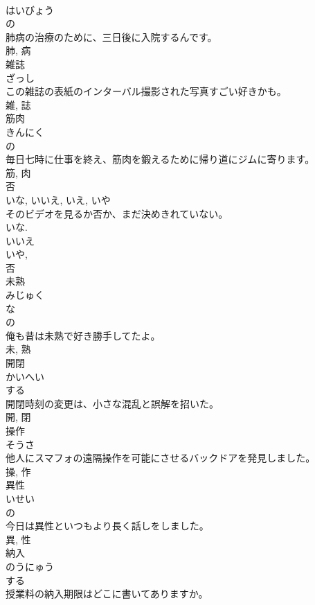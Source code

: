 \documentclass[8pt]{extreport}
\begin{document}
\begin{CJK}{UTF8}{min}
\\	はいびょう	
\\	の 
\\	肺病の治療のために、三日後に入院するんです。	
\\	肺, 病	
\\	雑誌	
\\	ざっし	
\\	この雑誌の表紙のインターバル撮影された写真すごい好きかも。	
\\	雑, 誌	
\\	筋肉	
\\	きんにく	
\\	の 
\\	毎日七時に仕事を終え、筋肉を鍛えるために帰り道にジムに寄ります。	
\\	筋, 肉	
\\	否	
\\	いな, いいえ, いえ, いや	
\\	そのビデオを見るか否か、まだ決めきれていない。	
\\	いな. 
\\	いいえ 
\\	いや, 
\\	否	
\\	未熟	
\\	みじゅく	
\\	な 
\\	の 
\\	俺も昔は未熟で好き勝手してたよ。	
\\	未, 熟	
\\	開閉	
\\	かいへい	
\\	する 
\\	開閉時刻の変更は、小さな混乱と誤解を招いた。	
\\	開, 閉	
\\	操作	
\\	そうさ	
\\	他人にスマフォの遠隔操作を可能にさせるバックドアを発見しました。	
\\	操, 作	
\\	異性	
\\	いせい	
\\	の 
\\	今日は異性といつもより長く話しをしました。	
\\	異, 性	
\\	納入	
\\	のうにゅう	
\\	する 
\\	授業料の納入期限はどこに書いてありますか。	

\end{CJK}
\end{document}
